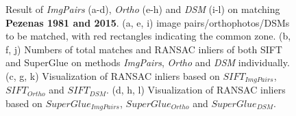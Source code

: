 \begin{figure}[htbp]
\begin{center}
{\begin{minipage}[t]{0.48\linewidth}
            \end{minipage}%
        }
        \caption{{\scriptsize Result of \textit{ImgPairs} (a-d), \textit{Ortho} (e-h) and \textit{DSM} (i-l) on matching \textbf{Pezenas 1981 and 2015}. (a, e, i) image pairs/orthophotos/DSMs to be matched, with red rectangles indicating the common zone. (b, f, j) Numbers of total matches and RANSAC inliers of both SIFT and SuperGlue on methods \textit{ImgPairs}, \textit{Ortho} and \textit{DSM} individually. (c, g, k) Visualization of RANSAC inliers based on $SIFT_{ImgPairs}$, $SIFT_{Ortho}$ and $SIFT_{DSM}$. (d, h, l) Visualization of RANSAC inliers based on $SuperGlue_{ImgPairs}$, $SuperGlue_{Ortho}$ and $SuperGlue_{DSM}$.}}        
        \label{MatchVizPezenas1981DSM}
    \end{center}
\end{figure} 



